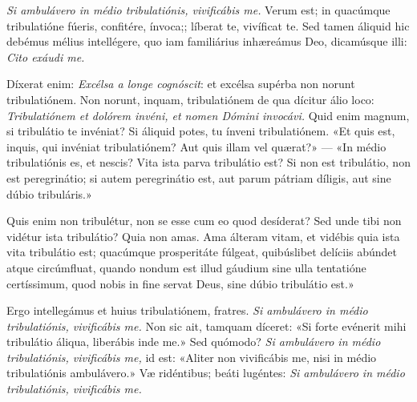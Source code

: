 {\noindent \emph{Si ambulávero in médio tribulatiónis, vivificábis me.} Verum est; in quacúmque tribulatióne fúeris, confitére, ínvoca;; líberat te, vivíficat te. Sed tamen áliquid hic debémus mélius intellégere, quo iam familiárius inhæreámus Deo, dicamúsque illi: \emph{Cito exáudi me.}

\noindent Díxerat enim: \emph{Excélsa a longe cognóscit}: et excélsa supérba non norunt tribulatiónem. Non norunt, inquam, tribulatiónem de qua dícitur álio loco: \emph{Tribulatiónem et dolórem invéni, et nomen Dómini invocávi.} Quid enim magnum, si tribulátio te invéniat? Si áliquid potes, tu ínveni tribulatiónem. «Et quis est, inquis, qui invéniat tribulatiónem? Aut quis illam vel quærat?» — «In médio tribulatiónis es, et nescis? Vita ista parva tribulátio est? Si non est tribulátio, non est peregrinátio; si autem peregrinátio est, aut parum pátriam díligis, aut sine dúbio tribuláris.»

\noindent Quis enim non tribulétur, non se esse cum eo quod desíderat? Sed unde tibi non vidétur ista tribulátio? Quia non amas. Ama álteram vitam, et vidébis quia ista vita tribulátio est; quacúmque prosperitáte fúlgeat, quibúslibet delíciis abúndet atque circúmfluat, quando nondum est illud gáudium sine ulla tentatióne certíssimum, quod nobis in fine servat Deus, sine dúbio tribulátio est.»

\noindent Ergo intellegámus et huius tribulatiónem, fratres. \emph{Si ambulávero in médio tribulatiónis, vivificábis me.} Non sic ait, tamquam díceret: «Si forte evénerit mihi tribulátio áliqua, liberábis inde me.» Sed quómodo? \emph{Si ambulávero in médio tribulatiónis, vivificábis me,} id est: «Aliter non vivificábis me, nisi in médio tribulatiónis ambulávero.» Væ ridéntibus; beáti lugéntes: \emph{Si ambulávero in médio tribulatiónis, vivificábis me.}

\vfill
\pagebreak

 

\vspace{-5mm}


\vfill
\pagebreak
}
\newcommand{\hymnuslaudes}{\pars{Hymnus} \scriptura{Alcuinus (\olddag{} 804)}

\cuminitiali{IV}{temporalia/hym-EcceIam.gtex}}
